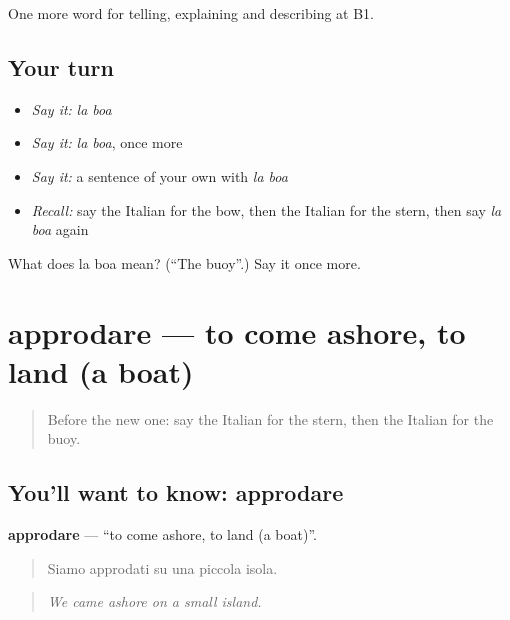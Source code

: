 \begin{grammarlens}[title={What you've built}]
One more word for telling, explaining and describing at B1.
\end{grammarlens}

\subsection*{Your turn}
\begin{itemize}
\raggedright
  \item \emph{Say it:} \emph{la boa}
  \item \emph{Say it:} \emph{la boa}, once more
  \item \emph{Say it:} a sentence of your own with \emph{la boa}
  \item \emph{Recall:} say the Italian for the bow, then the Italian for the stern, then say \emph{la boa} again
\end{itemize}

\begin{tcolorbox}[breakable,colback=teal!4,colframe=teal!35!black,title={Before you move on}]
What does la boa mean? (\textquotedblleft{}The buoy\textquotedblright{}.) Say it once more.
\end{tcolorbox}
\section[approdare]{approdare — to come ashore, to land (a boat)}

\label{lesson:IT-C424-approdare}



\begin{quote}
Before the new one: say the Italian for the stern, then the Italian for the buoy.
\end{quote}

\subsection*{You'll want to know: approdare}
\textbf{approdare} — \textquotedblleft{}to come ashore, to land (a boat)\textquotedblright{}.

\begin{quote}
Siamo approdati su una piccola isola.
\end{quote}

\begin{quote}
\emph{We came ashore on a small island.}
\end{quote}

